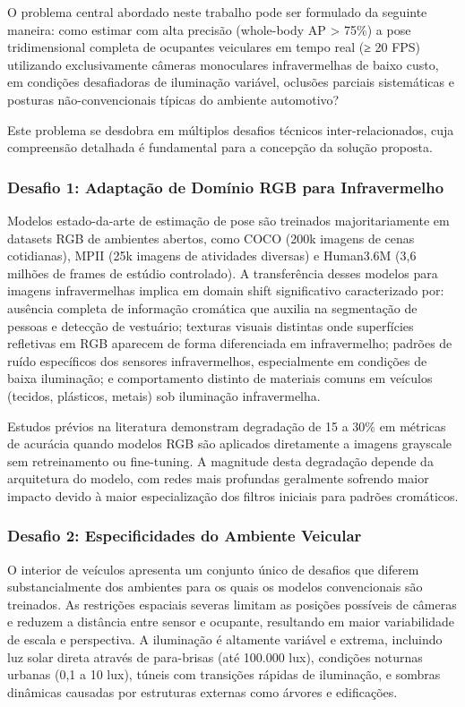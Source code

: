 \documentclass[12pt, a4paper]{article}
\begin{document}
O problema central abordado neste trabalho pode ser formulado da seguinte maneira: como estimar com alta precisão (whole-body AP > 75\%) a pose tridimensional completa de ocupantes veiculares em tempo real (≥ 20 FPS) utilizando exclusivamente câmeras monoculares infravermelhas de baixo custo, em condições desafiadoras de iluminação variável, oclusões parciais sistemáticas e posturas não-convencionais típicas do ambiente automotivo?

Este problema se desdobra em múltiplos desafios técnicos inter-relacionados, cuja compreensão detalhada é fundamental para a concepção da solução proposta.

\subsubsection{Desafio 1: Adaptação de Domínio RGB para Infravermelho}

Modelos estado-da-arte de estimação de pose são treinados majoritariamente em datasets RGB de ambientes abertos, como COCO (200k imagens de cenas cotidianas), MPII (25k imagens de atividades diversas) e Human3.6M (3,6 milhões de frames de estúdio controlado). A transferência desses modelos para imagens infravermelhas implica em domain shift significativo caracterizado por: ausência completa de informação cromática que auxilia na segmentação de pessoas e detecção de vestuário; texturas visuais distintas onde superfícies refletivas em RGB aparecem de forma diferenciada em infravermelho; padrões de ruído específicos dos sensores infravermelhos, especialmente em condições de baixa iluminação; e comportamento distinto de materiais comuns em veículos (tecidos, plásticos, metais) sob iluminação infravermelha.

Estudos prévios na literatura demonstram degradação de 15 a 30\% em métricas de acurácia quando modelos RGB são aplicados diretamente a imagens grayscale sem retreinamento ou fine-tuning. A magnitude desta degradação depende da arquitetura do modelo, com redes mais profundas geralmente sofrendo maior impacto devido à maior especialização dos filtros iniciais para padrões cromáticos.

\subsubsection{Desafio 2: Especificidades do Ambiente Veicular}

O interior de veículos apresenta um conjunto único de desafios que diferem substancialmente dos ambientes para os quais os modelos convencionais são treinados. As restrições espaciais severas limitam as posições possíveis de câmeras e reduzem a distância entre sensor e ocupante, resultando em maior variabilidade de escala e perspectiva. A iluminação é altamente variável e extrema, incluindo luz solar direta através de para-brisas (até 100.000 lux), condições noturnas urbanas (0,1 a 10 lux), túneis com transições rápidas de iluminação, e sombras dinâmicas causadas por estruturas externas como árvores e edificações.
\end{document}
